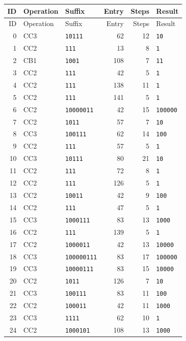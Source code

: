 \begin{longtable}{@{}rllrrl@{}}
\toprule
ID & Operation & Suffix & Entry & Steps & Result\\
\midrule
\endfirsthead
\toprule
ID & Operation & Suffix & Entry & Steps & Result\\
\midrule
\endhead
0 & CC3 & \texttt{10111} & 62 & 12 & \texttt{10}\\
1 & CC2 & \texttt{111} & 13 & 8 & \texttt{1}\\
2 & CB1 & \texttt{1001} & 108 & 7 & \texttt{11}\\
3 & CC2 & \texttt{111} & 42 & 5 & \texttt{1}\\
4 & CC2 & \texttt{111} & 138 & 11 & \texttt{1}\\
5 & CC2 & \texttt{111} & 141 & 5 & \texttt{1}\\
6 & CC2 & \texttt{10000011} & 42 & 15 & \texttt{100000}\\
7 & CC2 & \texttt{1011} & 57 & 7 & \texttt{10}\\
8 & CC3 & \texttt{100111} & 62 & 14 & \texttt{100}\\
9 & CC2 & \texttt{111} & 57 & 5 & \texttt{1}\\
10 & CC3 & \texttt{10111} & 80 & 21 & \texttt{10}\\
11 & CC2 & \texttt{111} & 72 & 8 & \texttt{1}\\
12 & CC2 & \texttt{111} & 126 & 5 & \texttt{1}\\
13 & CC2 & \texttt{10011} & 42 & 9 & \texttt{100}\\
14 & CC2 & \texttt{111} & 47 & 5 & \texttt{1}\\
15 & CC3 & \texttt{1000111} & 83 & 13 & \texttt{1000}\\
16 & CC2 & \texttt{111} & 139 & 5 & \texttt{1}\\
17 & CC2 & \texttt{1000011} & 42 & 13 & \texttt{10000}\\
18 & CC3 & \texttt{100000111} & 83 & 17 & \texttt{100000}\\
19 & CC3 & \texttt{10000111} & 83 & 15 & \texttt{10000}\\
20 & CC2 & \texttt{1011} & 126 & 7 & \texttt{10}\\
21 & CC3 & \texttt{100111} & 83 & 11 & \texttt{100}\\
22 & CC2 & \texttt{100011} & 42 & 11 & \texttt{1000}\\
23 & CC3 & \texttt{1111} & 62 & 10 & \texttt{1}\\
24 & CC2 & \texttt{1000101} & 108 & 13 & \texttt{1000}\\

\end{longtable}
